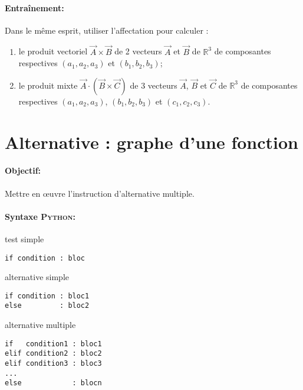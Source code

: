 \documentclass[11pt,a4paper,colorlinks,breaklinks]{article}
\def\python{\textsc{Python}}
\begin{document}
\paragraph{Entraînement:} Dans le m\^eme esprit, utiliser l'affectation pour calculer :
\begin{enumerate}
\item le produit vectoriel $\vec{A}\times\vec{B}$ de 2 vecteurs $\vec{A}$ et $\vec{B}$
	de $\mathbb{R}^3$ de composantes respectives $(a_1,a_2,a_3)$ et $(b_1,b_2,b_3)$;
\item le produit mixte $\vec{A}\cdot(\vec{B}\times\vec{C})$ de 3 vecteurs $\vec{A}$,
	$\vec{B}$ et $\vec{C}$ de $\mathbb{R}^3$ de composantes respectives $(a_1,a_2,a_3)$, 	
	$(b_1,b_2,b_3)$ et $(c_1,c_2,c_3)$.
\end{enumerate}


\newpage
\section{Alternative : graphe d'une fonction}\label{maths:alternative}
\paragraph{Objectif:} Mettre en \oe uvre l'instruction d'alternative multiple.

\paragraph{Syntaxe \python:} \mbox{}

\noindent\begin{minipage}[t]{0.3\textwidth}
test simple
\begin{Verbatim}
if condition : bloc
\end{Verbatim}
\end{minipage}
\hfill
\begin{minipage}[t]{0.3\textwidth}
alternative simple
\begin{Verbatim}
if condition : bloc1
else         : bloc2
\end{Verbatim}
\end{minipage}
\hfill
\begin{minipage}[t]{0.3\textwidth}
alternative multiple
\begin{Verbatim}
if   condition1 : bloc1
elif condition2 : bloc2
elif condition3 : bloc3
...
else            : blocn
\end{Verbatim}
\end{minipage}
\end{document}
